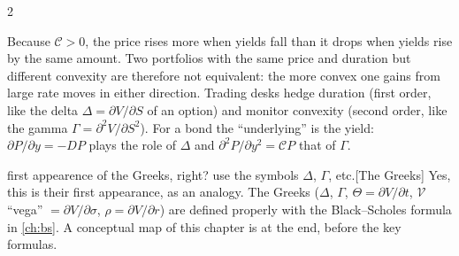 \begin{paracol}{2}
\begin{finance}
Because $\mathcal C>0$, the price rises more when yields fall than it drops when yields rise by the
same amount. Two portfolios with the same price and duration but different convexity are
therefore not equivalent: the more convex one gains from large rate moves in either direction.
Trading desks hedge duration (first order, like the delta $\Delta=\partial V/\partial S$ of an option) and
monitor convexity (second order, like the gamma $\Gamma=\partial^2 V/\partial S^2$). For a bond the
``underlying'' is the yield: $\partial P/\partial y=-DP$ plays the role of $\Delta$ and
$\partial^2P/\partial y^2=\mathcal C P$ that of $\Gamma$.
\end{finance}\begin{answer}{first appearence of the Greeks, right? use the symbols $\Delta$, $\Gamma$, etc.}[The Greeks]
Yes, this is their first appearance, as an analogy. The Greeks ($\Delta$, $\Gamma$, $\Theta=\partial V/\partial t$,
$\mathcal V$ ``vega'' $=\partial V/\partial\sigma$, $\rho=\partial V/\partial r$) are defined properly with the
Black--Scholes formula in \cref{ch:bs}. A conceptual map of this chapter is at the end, before the key formulas.
\end{answer}




\end{paracol}
